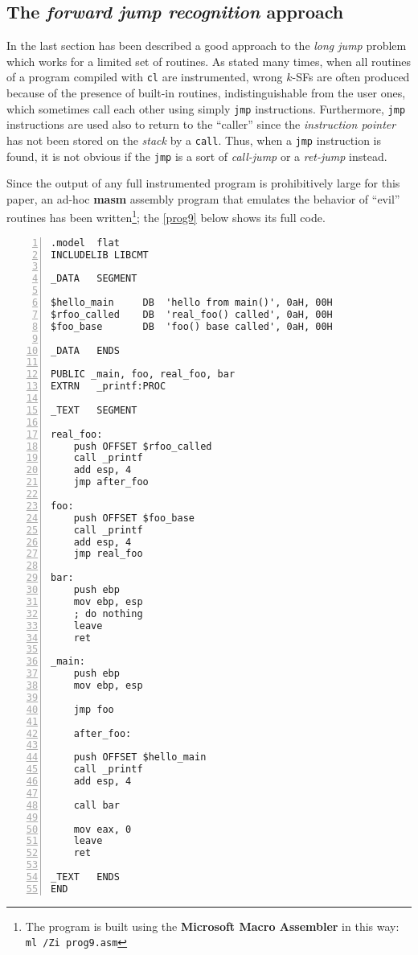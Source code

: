 \documentclass[a4paper,10pt]{report}
\begin{document}
\subsection{The \emph{forward jump recognition} approach}

In the last section has been described a good approach to the \emph{long jump} problem
which works for a limited set of routines. As stated many times, when
all routines of a program compiled with \verb|cl| are instrumented, wrong $k$-SFs
are often produced because of the presence of built-in routines, indistinguishable
from the user ones, which sometimes call each other using simply \verb|jmp| instructions.
Furthermore, \verb|jmp| instructions are used also to return to the ``caller''
since the \emph{instruction pointer} has not been stored on the \emph{stack}
by a \verb|call|. Thus, when a \verb|jmp| instruction is found, it is not obvious
if the \verb|jmp| is a sort of \emph{call-jump} or a \emph{ret-jump} instead.

Since the output of any full instrumented program is prohibitively large
for this paper, an ad-hoc \textbf{masm} assembly program that emulates the behavior
of ``evil'' routines has been written\footnote{The program is built using
the \textbf{Microsoft Macro Assembler} in this way: \texttt{ml /Zi prog9.asm}};
the \cref{prog9} below shows its full code.

\begin{lstlisting}[language={[x86masm]Assembler},
	label=prog9, caption={prog9.asm, a tricky program}, frame=leftline,
numbers=left, showstringspaces=false, deletekeywords={ah}]
.model	flat
INCLUDELIB LIBCMT

_DATA	SEGMENT

$hello_main		DB	'hello from main()', 0aH, 00H
$rfoo_called	DB	'real_foo() called', 0aH, 00H
$foo_base		DB	'foo() base called', 0aH, 00H

_DATA	ENDS

PUBLIC _main, foo, real_foo, bar
EXTRN	_printf:PROC

_TEXT	SEGMENT

real_foo:
	push OFFSET $rfoo_called
	call _printf
	add esp, 4
	jmp after_foo

foo:
	push OFFSET $foo_base
	call _printf
	add esp, 4
	jmp real_foo

bar:
	push ebp
	mov ebp, esp
	; do nothing
	leave
	ret

_main:
	push ebp
	mov ebp, esp

	jmp foo

	after_foo:

	push OFFSET $hello_main
	call _printf
	add esp, 4

	call bar

	mov eax, 0
	leave
	ret

_TEXT	ENDS
END

\end{lstlisting}
\end{document}
